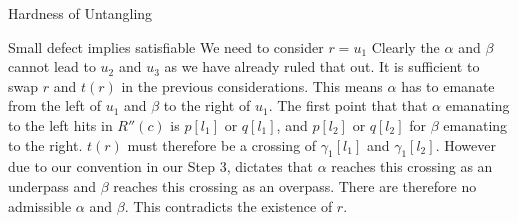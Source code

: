 \documentclass{beamer}
\begin{document}
\begin{section}{Hardness of Untangling}
    \begin{frame}{Small defect implies satisfiable}
        We need to consider $r=u_1$
        \newline
        \newline
        Clearly the $\alpha$ and $\beta$ cannot lead to $u_2$ and $u_3$ as we have already ruled that out. It is sufficient to swap $r$ and $t(r)$ in the previous considerations. 
        This means $\alpha$  has to emanate from the left of $u_1$ and $\beta$ to the right of $u_1$. 
        \newline
        \newline
        The first point that that $\alpha$ emanating to the left hits in $R''(c)$ is $p[l_1]$ or $q[l_1]$, and $p[l_2]$ or $q[l_2]$ for $\beta$ emanating to the right. 
        \newline
        \newline
        $t(r)$ must therefore be a crossing of $\gamma_1[l_1]$ and $\gamma_1[l_2]$. 
        \newline
        \newline
        However due to our convention in our Step 3, dictates that $\alpha$ reaches this crossing as an underpass and $\beta$ reaches this crossing as an overpass. There are therefore no admissible $\alpha$ and $\beta$. This contradicts the existence of $r$. 
        
        
    \end{frame}
    
\end{section}
\fi
\end{document}

